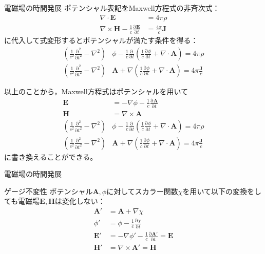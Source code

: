 \documentclass[unicode, aspectratio=169, 12pt]{beamer}
\newcommand{\pdiff}[2]{\frac{\mathrm{\partial} #1}{\mathrm{\partial} #2}} %
\begin{document}
\begin{frame}{電磁場の時間発展}
    ポテンシャル表記をMaxwell方程式の非斉次式：
    \begin{align*}
    \nabla \cdot \bm{E} &= 4\pi\rho \\
    \nabla \times \bm{H}-\frac{1}{c}\pdiff{\bm{E}}{t} &= \frac{4\pi}{c}\bm{J}
    \end{align*}
    に代入して式変形するとポテンシャルが満たす条件を得る：
    \begin{align*}
        \left(\frac{1}{c^2}\pdiff{^2}{t^2}-\nabla^2\right)&\phi- \frac{1}{c}\pdiff{}{t}\left(\frac{1}{c}\pdiff{\phi}{t}+\nabla\cdot\bm{A}\right)=4\pi\rho\\
        \left(\frac{1}{c^2}\pdiff{^2}{t^2}-\nabla^2\right)&\bm{A}+ \nabla\left(\frac{1}{c}\pdiff{\phi}{t}+\nabla\cdot\bm{A}\right)=4\pi\frac{\bm{J}}{c}
    \end{align*}    %
\end{frame}


\begin{frame}
    以上のことから，Maxwell方程式はポテンシャルを用いて
    \begin{align*}
        \bm{E}&=-\nabla\phi-\frac{1}{c}\pdiff{\bm{A}}{t}\\
        \bm{H}&=\nabla\times\bm{A}\\
        \left(\frac{1}{c^2}\pdiff{^2}{t^2}-\nabla^2\right)&\phi- \frac{1}{c}\pdiff{}{t}\left(\frac{1}{c}\pdiff{\phi}{t}+\nabla\cdot\bm{A}\right)=4\pi\rho\\
        \left(\frac{1}{c^2}\pdiff{^2}{t^2}-\nabla^2\right)&\bm{A}+ \nabla\left(\frac{1}{c}\pdiff{\phi}{t}+\nabla\cdot\bm{A}\right)=4\pi\frac{\bm{J}}{c}
    \end{align*}
    に書き換えることができる。
\end{frame}

\begin{frame}{電磁場の時間発展}
    \begin{block}{ゲージ不変性}
        ポテンシャル$\bm{A},\phi$に対してスカラー関数$\chi$を用いて以下の変換をしても電磁場$\bm{E},\bm{H}$は変化しない：
        \begin{align*}
            \bm{A}'&=\bm{A}+\nabla\chi\\
            \phi'&=\phi-\frac{1}{c}\pdiff{\chi}{t}\\
            \bm{E}'&=-\nabla\phi'-\frac{1}{c}\pdiff{\bm{A}'}{t}=\bm{E}\\
            \bm{H}'&=\nabla\times\bm{A}'=\bm{H}
        \end{align*}
    \end{block}
\end{frame}
\end{document}
